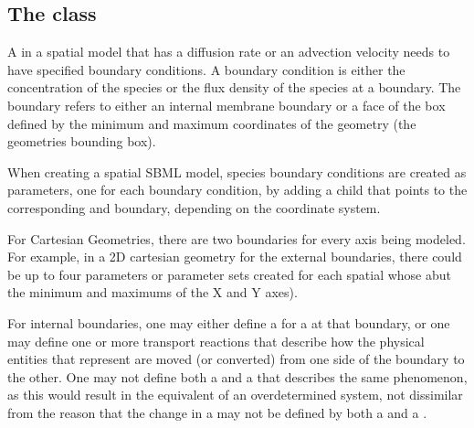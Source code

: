 \subsection{The  class}
\label{boundarycondition-class}
A \Species in a spatial model that has a diffusion rate or an advection velocity needs to have specified boundary conditions. A boundary condition is either the concentration of the species or the flux density of the species at a boundary.  The boundary refers to either an internal membrane boundary or a face of the box defined by the minimum and maximum coordinates of the geometry (the geometries bounding box).

When creating a spatial SBML model, species boundary conditions are created as parameters, one for each boundary condition, by adding a child \BoundaryCondition that points to the corresponding \Species and boundary, depending on the coordinate system.

For Cartesian Geometries, there are two boundaries for every axis being modeled.  For example, in a 2D cartesian geometry for the external boundaries, there could be up to four parameters or parameter sets created for each spatial \Species whose \Compartments abut the minimum and maximums of the X and Y axes).



For internal boundaries, one may either define a \BoundaryCondition for a \Species at that boundary, or one may define one or more transport reactions that describe how the physical entities that \Species represent are moved (or converted) from one side of the boundary to the other.  One may not define both a \BoundaryCondition and a \Reaction that describes the same phenomenon, as this would result in the equivalent of an overdetermined system, not dissimilar from the reason that the change in a \Species may not be defined by both a \Reaction and a \RateRule.

